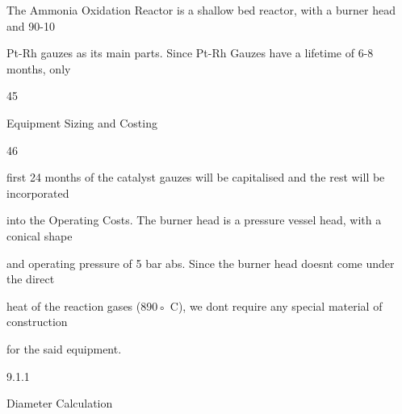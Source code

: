 \documentclass[a4paper,portrait,12pt]{article}
\begin{document}
\begin{flushleft}
The Ammonia Oxidation Reactor is a shallow bed reactor, with a burner head and 90-10
\end{flushleft}


\begin{flushleft}
Pt-Rh gauzes as its main parts. Since Pt-Rh Gauzes have a lifetime of 6-8 months, only
\end{flushleft}


45





\begin{flushleft}
\newpage
Equipment Sizing and Costing
\end{flushleft}





46





\begin{flushleft}
first 24 months of the catalyst gauzes will be capitalised and the rest will be incorporated
\end{flushleft}


\begin{flushleft}
into the Operating Costs. The burner head is a pressure vessel head, with a conical shape
\end{flushleft}


\begin{flushleft}
and operating pressure of 5 bar abs. Since the burner head doesnt come under the direct
\end{flushleft}


\begin{flushleft}
heat of the reaction gases (890◦ C), we dont require any special material of construction
\end{flushleft}


\begin{flushleft}
for the said equipment.
\end{flushleft}





9.1.1





\begin{flushleft}
Diameter Calculation
\end{flushleft}
\end{document}
